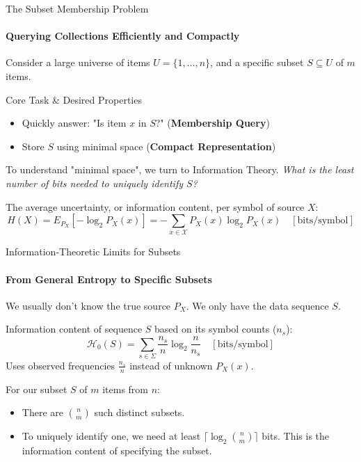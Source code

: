 
\begin{frame}{The Subset Membership Problem}
    \framesubtitle{Querying Collections Efficiently and Compactly}

    Consider a large universe of items $U = \{1, \dots, n\}$, and a specific subset $S \subseteq U$ of $m$ items.

    \begin{alertblock}{Core Task \& Desired Properties}
        \begin{itemize}
            \item Quickly answer: "Is item $x$ in $S$?" (\textbf{Membership Query})
            \item Store $S$ using minimal space (\textbf{Compact Representation})
        \end{itemize}
    \end{alertblock}
    \pause %

    To understand "minimal space", we turn to Information Theory.
    \textit{What is the least number of bits needed to uniquely identify $S$?}
    \pause
    \begin{definition}
        The average uncertainty, or information content, per symbol of source $X$:
        \[ H(X) = E_{P_X}[-\log_2 P_X(x)] = -\sum_{x \in \mathcal{X}} P_X(x) \log_2 P_X(x) \quad [\text{bits/symbol}] \]
    \end{definition}
\end{frame}

\begin{frame}{Information-Theoretic Limits for Subsets}
    \framesubtitle{From General Entropy to Specific Subsets}
    We usually don't know the true source $P_X$. We only have the data sequence $S$.
    \pause
    \begin{definition}
        Information content of sequence $S$ based on its symbol counts ($n_s$):
        \[ \mathcal{H}_0(S) = \sum_{s \in \Sigma} \frac{n_s}{n} \log_2 \frac{n}{n_s} \quad [\text{bits/symbol}] \]
        \vspace{-0.2em}
        Uses observed frequencies $\frac{n_s}{n}$ instead of unknown $P_X(x)$.
    \end{definition}

    \pause %
    For our subset $S$ of $m$ items from $n$:
    \begin{itemize}
        \item There are $\binom{n}{m}$ such distinct subsets.
        \item To uniquely identify one, we need at least $\lceil \log_2 \binom{n}{m} \rceil$ bits. This is the \alert{information content} of specifying the subset.
    \end{itemize}

\end{frame}

